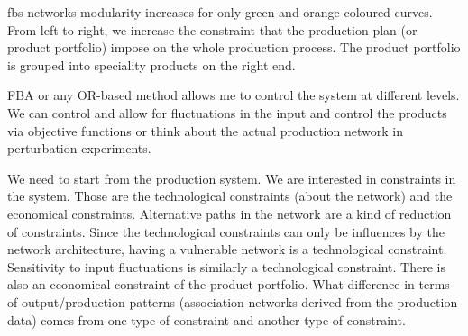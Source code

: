 \acs{fbs} networks modularity increases for only green and orange coloured curves. From left to right, we increase the constraint that the production plan (or product portfolio) impose on the whole production process. The product portfolio is grouped into speciality products on the right end.

FBA or any OR-based method allows me to control the system at different levels. We can control and allow for fluctuations in the input and control the products via objective functions or think about the actual production network in perturbation experiments. 

We need to start from the production system. We are interested in constraints in the system. Those are the technological constraints (about the network) and the economical constraints.  Alternative paths in the network are a kind of reduction of constraints. Since the technological constraints can only be influences by the network architecture, having a vulnerable network is a technological constraint. Sensitivity to input fluctuations is similarly a technological constraint. There is also an economical constraint of the product portfolio. What difference in terms of output/production patterns (association networks derived from the production data) comes from one type of constraint and another type of constraint.